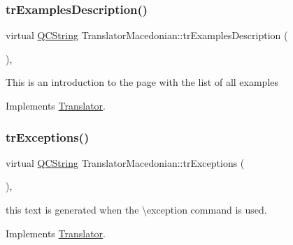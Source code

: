 \mbox{\label{class_translator_macedonian_a22a163ba60128e0e05da84bd79a03923}} 
\subsubsection{\texorpdfstring{trExamplesDescription()}{trExamplesDescription()}}
{\footnotesize\ttfamily virtual \mbox{\hyperlink{class_q_c_string}{Q\+C\+String}} Translator\+Macedonian\+::tr\+Examples\+Description (\begin{DoxyParamCaption}{ }\end{DoxyParamCaption})\hspace{0.3cm}{\ttfamily [inline]}, {\ttfamily [virtual]}}

This is an introduction to the page with the list of all examples 

Implements \mbox{\hyperlink{class_translator}{Translator}}.

\mbox{\label{class_translator_macedonian_ac4634a2d76a14595fef2d9d05cc4212c}} 
\subsubsection{\texorpdfstring{trExceptions()}{trExceptions()}}
{\footnotesize\ttfamily virtual \mbox{\hyperlink{class_q_c_string}{Q\+C\+String}} Translator\+Macedonian\+::tr\+Exceptions (\begin{DoxyParamCaption}{ }\end{DoxyParamCaption})\hspace{0.3cm}{\ttfamily [inline]}, {\ttfamily [virtual]}}

this text is generated when the \textbackslash{}exception command is used. 

Implements \mbox{\hyperlink{class_translator}{Translator}}.

\mbox{\label{class_translator_macedonian_af6d23c54e89d969ac93e1901c472189a}} 
